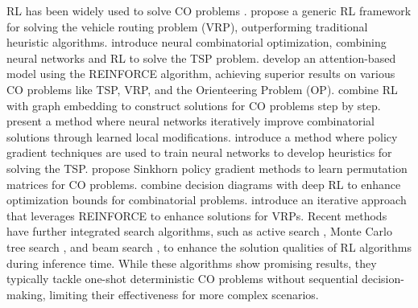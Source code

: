 RL has been widely used to solve CO problems \cite{mazyavkina2021reinforcement}. \citet{nazari2018reinforcement} propose a generic RL framework for solving the vehicle routing problem (VRP), outperforming traditional heuristic algorithms. \citet{bello2016neural} introduce neural combinatorial optimization, combining neural networks and RL to solve the TSP problem. \citet{kool2018attention} develop an attention-based model using the REINFORCE algorithm, achieving superior results on various CO problems like TSP, VRP, and the Orienteering Problem (OP). \citet{khalil2017learning} combine RL with graph embedding to construct solutions for CO problems step by step. \citet{chen2019learning} present a method where neural networks iteratively improve combinatorial solutions through learned local modifications. \citet{deudon2018learning} introduce a method where policy gradient techniques are used to train neural networks to develop heuristics for solving the TSP. \citet{emami2018learning} propose Sinkhorn policy gradient methods to learn permutation matrices for CO problems. \citet{cappart2019improving} combine decision diagrams with deep RL to enhance optimization bounds for combinatorial problems. \citet{lu2019learning} introduce an iterative approach that leverages REINFORCE to enhance solutions for VRPs. Recent methods have further integrated search algorithms, such as active search \citep{hottung2021efficient}, Monte Carlo tree search \citep{fu2021generalize}, and beam search \citep{kwon2020pomo}, to enhance the solution qualities of RL algorithms during inference time. While these algorithms show promising results, they typically tackle one-shot deterministic CO problems without sequential decision-making, limiting their effectiveness for more complex scenarios.

